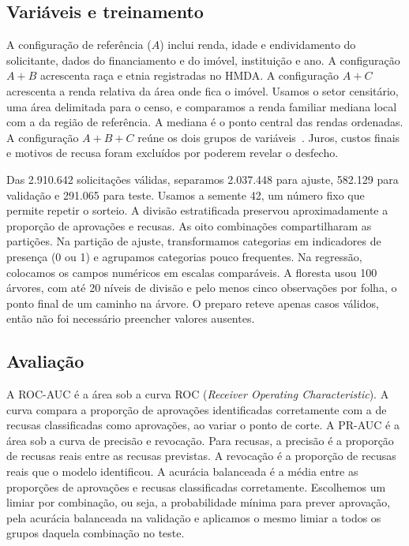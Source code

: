 \documentclass[12pt]{article}
\begin{document}
\subsection{Variáveis e treinamento}

A configuração de referência ($A$) inclui renda, idade e endividamento do
solicitante, dados do financiamento e do imóvel, instituição e ano.
A configuração $A+B$ acrescenta raça e etnia registradas no HMDA.
A configuração $A+C$ acrescenta a renda relativa da área onde fica o
imóvel. Usamos o setor censitário, uma área delimitada para o censo,
e comparamos a renda familiar mediana local com a da região de
referência. A mediana é o ponto central das rendas ordenadas. A
configuração $A+B+C$ reúne os dois grupos de
variáveis~\cite{ffiec:lar,ffiec:censo}. Juros, custos finais e motivos de
recusa foram excluídos por poderem revelar o desfecho.

Das 2.910.642 solicitações válidas, separamos 2.037.448 para
ajuste, 582.129 para validação e 291.065 para teste. Usamos a semente
42, um número fixo que permite repetir o sorteio.
A divisão estratificada preservou aproximadamente a proporção de
aprovações e recusas. As oito combinações compartilharam as
partições. Na partição de ajuste, transformamos categorias em
indicadores de presença (0 ou 1) e agrupamos categorias pouco
frequentes. Na regressão, colocamos os campos numéricos em escalas
comparáveis. A floresta usou 100 árvores, com até 20 níveis de
divisão e pelo menos cinco observações por folha, o ponto final de
um caminho na árvore. O preparo reteve apenas casos válidos, então
não foi necessário preencher valores ausentes.

\subsection{Avaliação}

A ROC-AUC é a área sob a curva ROC (\textit{Receiver Operating
Characteristic}). A curva compara a proporção de aprovações
identificadas corretamente com a de recusas classificadas como
aprovações, ao variar o ponto de corte. A PR-AUC é a área sob a
curva de precisão e revocação. Para recusas, a precisão é a
proporção de recusas reais entre as recusas previstas. A revocação
é a proporção de recusas reais que o modelo identificou. A acurácia
balanceada é a média entre as proporções de aprovações e recusas
classificadas corretamente. Escolhemos um limiar por combinação,
ou seja, a probabilidade mínima para prever aprovação,
pela acurácia balanceada na validação e aplicamos o mesmo limiar
a todos os grupos daquela combinação no teste.
\end{document}
